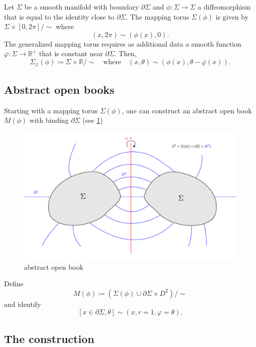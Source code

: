 \begin{definition}
    Let $\Sigma$ be a smooth manifold with boundary $\partial \Sigma$ and $\phi: \Sigma \to \Sigma$ a diffeomorphism that is equal to the identity close to $\partial \Sigma$.
    The mapping torus $\Sigma(\phi)$ is given by
     $\Sigma \times [0,2\pi]/\sim$ where
     \[
        (x, 2\pi) \sim (\phi(x), 0). 
     \]
     The generalized mapping torus requires as additional data a smooth function $\overline{\varphi}: \Sigma \to \mathbb R^+$ that is constant near $\partial \Sigma$. Then,
     \[
        \Sigma_{\overline{\varphi}}(\phi) \coloneqq \Sigma \times \mathbb R/\sim \quad \text{where} \quad  (x, \theta) \sim (\phi(x), \theta - \overline{\varphi}(x)).
     \]
\end{definition}

\subsection*{Abstract open books}
Starting with a mapping torus $\Sigma(\phi)$, one can construct an abstract open book $M(\phi)$ with binding $\partial \Sigma$ (see \cref{fig:abstract_open_book})
\begin{figure}[ht]
    \includegraphics*[width=\textwidth]{images/abstract_open_book.pdf}
    \caption[abstract open book]{abstract open book}
    \label{fig:abstract_open_book}
\end{figure}

Define
\[
    M(\phi) \coloneqq \left(\Sigma(\phi) \cup \partial \Sigma \times D^2\right)/\sim
\]
and identify
\[
    [x \in \partial \Sigma, \theta] \sim (x, r=1, \varphi = \theta).
\]


\subsection*{The construction}

